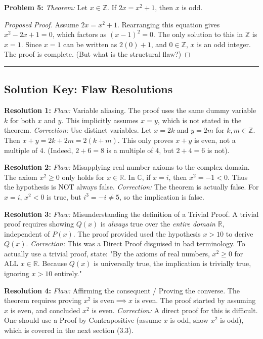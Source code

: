 \documentclass[11pt]{article}
\theoremstyle{remark}
\begin{document}
\textbf{Problem 5:}
\textit{Theorem:} Let $x \in \mathbb{Z}$. If $2x = x^2 + 1$, then $x$ is odd.
\begin{proof}[Proposed Proof]
Assume $2x = x^2 + 1$. Rearranging this equation gives $x^2 - 2x + 1 = 0$, which factors as $(x-1)^2 = 0$. The only solution to this in $\mathbb{Z}$ is $x = 1$. Since $x=1$ can be written as $2(0) + 1$, and $0 \in \mathbb{Z}$, $x$ is an odd integer. The proof is complete. (But what is the structural flaw?)
\end{proof}

\vspace{0.5cm}
\hrule
\vspace{0.5cm}

\subsection{Solution Key: Flaw Resolutions}

\textbf{Resolution 1:} 
\textit{Flaw:} Variable aliasing. The proof uses the same dummy variable $k$ for both $x$ and $y$. This implicitly assumes $x = y$, which is not stated in the theorem. 
\textit{Correction:} Use distinct variables. Let $x = 2k$ and $y = 2m$ for $k,m \in \mathbb{Z}$. Then $x+y = 2k+2m = 2(k+m)$. This only proves $x+y$ is even, not a multiple of 4. (Indeed, $2+6=8$ is a multiple of 4, but $2+4=6$ is not).

\textbf{Resolution 2:}
\textit{Flaw:} Misapplying real number axioms to the complex domain. The axiom $x^2 \ge 0$ only holds for $x \in \mathbb{R}$. In $\mathbb{C}$, if $x = i$, then $x^2 = -1 < 0$. Thus the hypothesis is NOT always false. 
\textit{Correction:} The theorem is actually false. For $x = i$, $x^2 < 0$ is true, but $i^3 = -i \neq 5$, so the implication is false.

\textbf{Resolution 3:}
\textit{Flaw:} Misunderstanding the definition of a Trivial Proof. A trivial proof requires showing $Q(x)$ is \textit{always} true over the \textit{entire domain} $\mathbb{R}$, independent of $P(x)$. The proof provided used the hypothesis $x > 10$ to derive $Q(x)$. 
\textit{Correction:} This was a Direct Proof disguised in bad terminology. To actually use a trivial proof, state: "By the axioms of real numbers, $x^2 \ge 0$ for ALL $x \in \mathbb{R}$. Because $Q(x)$ is universally true, the implication is trivially true, ignoring $x>10$ entirely."

\textbf{Resolution 4:}
\textit{Flaw:} Affirming the consequent / Proving the converse. The theorem requires proving $x^2 \text{ is even} \implies x \text{ is even}$. The proof started by assuming $x$ is even, and concluded $x^2$ is even. 
\textit{Correction:} A direct proof for this is difficult. One should use a Proof by Contrapositive (assume $x$ is odd, show $x^2$ is odd), which is covered in the next section (3.3).
\end{document}
